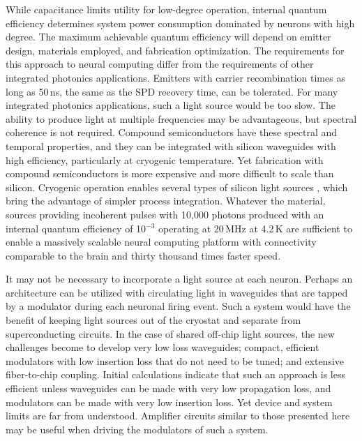 \documentclass[aip,amsmath,amssymb,reprint,nofootinbib]{revtex4-1}
\begin{document}
While capacitance limits utility for low-degree operation, internal quantum efficiency determines system power consumption dominated by neurons with high degree. The maximum achievable quantum efficiency will depend on emitter design, materials employed, and fabrication optimization. The requirements for this approach to neural computing differ from the requirements of other integrated photonics applications. Emitters with carrier recombination times as long as 50\,ns, the same as the SPD recovery time, can be tolerated. For many integrated photonics applications, such a light source would be too slow. The ability to produce light at multiple frequencies may be advantageous, but spectral coherence is not required. Compound semiconductors have these spectral and temporal properties, and they can be integrated with silicon waveguides \cite{doro2017} with high efficiency, particularly at cryogenic temperature. Yet fabrication with compound semiconductors is more expensive and more difficult to scale than silicon. Cryogenic operation enables several types of silicon light sources \cite{da1989,shxu2007,buch2017}, which bring the advantage of simpler process integration. Whatever the material, sources providing incoherent pulses with 10,000 photons produced with an internal quantum efficiency of 10$^{-3}$ operating at 20\,MHz at 4.2\,K are sufficient to enable a massively scalable neural computing platform with connectivity comparable to the brain and thirty thousand times faster speed.

It may not be necessary to incorporate a light source at each neuron. Perhaps an architecture can be utilized with circulating light in waveguides that are tapped by a modulator during each neuronal firing event. Such a system would have the benefit of keeping light sources out of the cryostat and separate from superconducting circuits. In the case of shared off-chip light sources, the new challenges become to develop very low loss waveguides; compact, efficient modulators with low insertion loss that do not need to be tuned; and extensive fiber-to-chip coupling. Initial calculations indicate that such an approach is less efficient unless waveguides can be made with very low propagation loss, and modulators can be made with very low insertion loss. Yet device and system limits are far from understood. Amplifier circuits similar to those presented here may be useful when driving the modulators of such a system.
\end{document}
